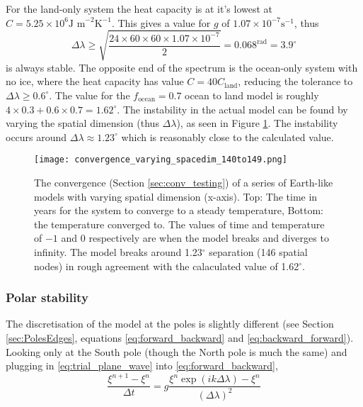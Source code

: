 \documentclass[12pt, onecolumn]{revtex4-2}    %
\begin{document}
For the land-only system the heat capacity is at it's lowest at $C=5.25\times10^6 \text{J m}^{-2} \text{K}^{-1}$.
This gives a value for $g$ of $1.07\times10^{-7} \text{s}^{-1}$, thus
\begin{equation*}
    \Delta\lambda \ge \sqrt{\frac{24\times60\times60\times1.07\times10^{-7}}{2}} = 0.068 ^{\text{rad}} = 3.9 ^{\circ}
\end{equation*}
is always stable.
The opposite end of the spectrum is the ocean-only system with no ice, where the heat capacity has value $C = 40 C_{\text{land}}$, reducing the tolerance to $\Delta\lambda \ge 0.6 ^{\circ}$.
The value for the $f_{\text{ocean}} = 0.7$ ocean to land model is roughly $4 \times 0.3 + 0.6 \times 0.7 = 1.62^{\circ}$.
The instability in the actual model can be found by varying the spatial dimension (thus $\Delta \lambda$), as seen in Figure \ref{fig:conv_spacedim}.
The instability occurs around $\Delta\lambda \approx 1.23^{\circ}$ which is reasonably close to the calculated value.

\begin{figure}[h]
    \texttt{[image: convergence\_varying\_spacedim\_140to149.png]}
    \caption{The convergence (Section \ref{sec:conv_testing}) of a series of Earth-like models with varying spatial dimension (x-axis). Top: The time in years for the system to converge to a steady temperature, Bottom: the temperature converged to.
        The values of time and temperature of $-1$ and $0$ respectively are when the model breaks and diverges to infinity.
        The model breaks around 1.23$^{\circ}$ separation (146 spatial nodes) in rough agreement with the calaculated value of 1.62$^{\circ}$. }
    \label{fig:conv_spacedim}
\end{figure}

\subsubsection*{Polar stability}
The discretisation of the model at the poles is slightly different (see Section \ref{sec:PolesEdges}, equations \eqref{eq:forward_backward} and \eqref{eq:backward_forward}).
Looking only at the South pole (though the North pole is much the same) and plugging in \eqref{eq:trial_plane_wave} into \eqref{eq:forward_backward},
\begin{equation}
    \frac{\xi^{n+1} - \xi^{n}}{\Delta t} = g\frac{\xi^n \exp(i k \Delta\lambda) - \xi^n}{(\Delta\lambda)^2}
\end{equation}
\end{document}
